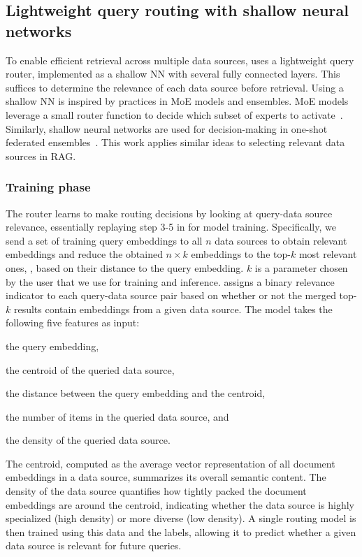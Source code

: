 \subsection{Lightweight query routing with shallow neural networks}
\label{s:query-routing}
To enable efficient retrieval across multiple data sources, \sys uses a lightweight query router, implemented as a shallow \ac{NN} with several fully connected layers.
This suffices to determine the relevance of each data source before retrieval.
Using a shallow \ac{NN} is inspired by practices in \ac{MoE} models and ensembles.
\ac{MoE} models leverage a small router function to decide which subset of experts to activate~\cite{zhou2022mixture}.
Similarly, shallow neural networks are used for decision-making in one-shot federated ensembles~\cite{allouah2024effectiveness}.
This work applies similar ideas to selecting relevant data sources in \ac{RAG}.

\subsubsection{Training phase}
The \sys router learns to make routing decisions by looking at query-data source relevance, essentially replaying step 3-5 in  for model training.
Specifically, we send a set of training query embeddings to all $n$ data sources to obtain relevant embeddings and reduce the obtained $ n \times k $ embeddings to the top-$k$ most relevant ones, \eg, based on their distance to the query embedding.
$k$ is a parameter chosen by the user that we use for training and inference.
\sys assigns a binary relevance indicator to each query-data source pair based on whether or not the merged top-$k$ results contain embeddings from a given data source.
The model takes the following five features as input:
\begin{enumerate*}[label=\emph{(\roman*)}]
\item the query embedding,
\item the centroid of the queried data source,
\item the distance between the query embedding and the centroid,
\item the number of items in the queried data source, and
\item the density of the queried data source.
\end{enumerate*}
The centroid, computed as the average vector representation of all document embeddings in a data source, summarizes its overall semantic content.
The density of the data source quantifies how tightly packed the document embeddings are around the centroid, indicating whether the data source is highly specialized (high density) or more diverse (low density).
A single routing model is then trained using this data and the labels, allowing it to predict whether a given data source is relevant for future queries.

